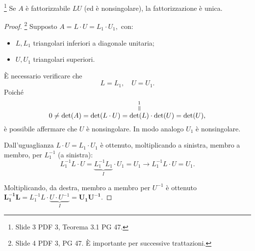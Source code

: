 \begin{theorem}\footnote{Slide 3 PDF 3, Teorema 3.1 PG 47.}\label{th:unicita_fattorizzazione_LU}
    Se $A$ è fattorizzabile $LU$ (ed è nonsingolare), la fattorizzazione è unica. 
\end{theorem}
\begin{proof}
    \footnote{Slide 4 PDF 3, PG 47. È importante per successive trattazioni.} Supposto $A=L\cdot U = L_1\cdot U_1,$ con:
    \begin{itemize}
        \item $L, L_1$ triangolari inferiori a diagonale unitaria;
        \item $U, U_1$ triangolari superiori.
    \end{itemize}
    È necessario verificare che
    \begin{equation*}
        L=L_1,\quad U=U_1.
    \end{equation*}
    Poiché
    \begin{equation*}
        0\neq\det(A)=\det(L\cdot U)= \equaltoup{\det(L)}{1}\cdot \det(U)=\det(U),
    \end{equation*}
    è possibile affermare che $U$ è nonsingolare. In modo analogo $U_1$ è nonsingolare.

    Dall'uguaglianza $L\cdot U= L_1\cdot U_1$ è ottenuto, moltiplicando a sinistra, membro a membro, per $L_1^{-1}$ (a sinistra): 
    \begin{equation*}
        L_1^{-1}L\cdot U= \underbrace{L_1^{-1}L_1}_{I}\cdot U_1=U_1\longrightarrow L_1^{-1}L\cdot U= U_1.
    \end{equation*}

    Moltiplicando, da destra, membro a membro per $U^{-1}$ è ottenuto $\boldsymbol{L_1^{-1}L=}L_1^{-1}L\cdot \underbrace{U\cdot U^{-1}}_I= \boldsymbol{U_1U^{-1}}.$
    

\end{proof}
